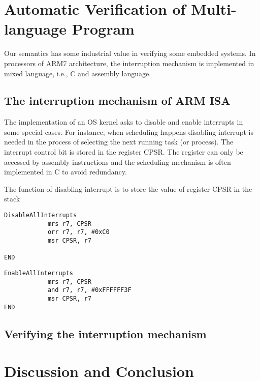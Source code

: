 \documentclass[conference]{IEEEtran}
\begin{document}
\section{Automatic Verification of Multi-language Program}
\par Our semantics has some industrial value in verifying some embedded systems. In processors of ARM7 architecture, the interruption mechanism is implemented in mixed language, i.e., C and assembly language. 
\subsection{The interruption mechanism of ARM ISA}
\par The implementation of an OS kernel asks to disable and enable interrupts in some special cases. For instance, when scheduling happens disabling interrupt is needed in the process of selecting the next running task (or process). The interrupt control bit is stored in the register CPSR. The register can only be accessed by assembly instructions and the scheduling mechanism is often implemented in C to avoid redundancy.
\par The function of disabling interrupt is to store the value of register CPSR in the stack 
\begin{lstlisting}[xleftmargin=1em]
DisableAllInterrupts					
			mrs r7, CPSR								
			orr r7, r7, #0xC0						
			msr CPSR, r7								
			
END	
\end{lstlisting}

\begin{lstlisting}[xleftmargin=1em]
EnableAllInterrupts																		
			mrs r7, CPSR								
			and r7, r7, #0xFFFFFF3F			
			msr CPSR, r7							
END									
\end{lstlisting}
\subsection{Verifying the interruption mechanism}
\section{Discussion and Conclusion}
\end{document}

